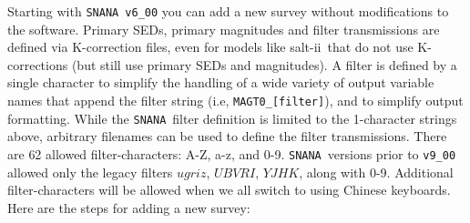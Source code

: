 \documentclass[12pt]{article}
\newcommand{\SALTII}{{\sc salt-ii}}
\newcommand{\snana}{{\tt SNANA}}
\newcommand{\MXFILTOBS}{62}
\begin{document}
Starting with {\tt SNANA v6\_00} you can add a new survey
without modifications to the software. 
Primary SEDs, primary magnitudes and filter transmissions
are defined via K-correction files, 
even for models like \SALTII\ that do not use K-corrections
(but still use primary SEDs and magnitudes).
A filter is defined by a single character to simplify the 
handling of a wide variety of output variable
names that append the filter string (i.e, {\tt MAGT0\_[filter]}),
and to simplify output formatting.
While the \snana\ filter definition is limited to the 1-character
strings above, arbitrary filenames can be used to define
the filter transmissions. 
There are {\MXFILTOBS} allowed filter-characters: A-Z, a-z, and 0-9.
\snana\ versions  prior to {\tt v9\_00} allowed only the legacy
filters $ugriz$, $UBVRI$, $YJHK$, along with 0-9.
Additional filter-characters will be allowed when we
all switch to using Chinese keyboards.
Here are the steps for adding a new survey:
%
\end{document}
